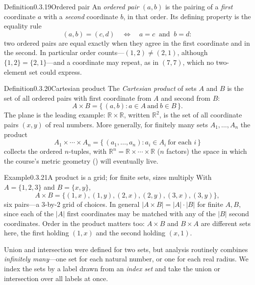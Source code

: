 \documentclass[main.tex]{subfiles}
\begin{document}
\begin{Obj}{Definition}{0.3.19}{Ordered pair}
An \emph{ordered pair} $(a,b)$ is the pairing of a \emph{first} coordinate $a$ with a \emph{second}
coordinate $b$, in that order. Its defining property is the equality rule
\[
(a,b)=(c,d)\quad\Longleftrightarrow\quad a=c \ \text{ and }\ b=d :
\]
two ordered pairs are equal exactly when they agree in the first coordinate and in the second. In
particular order counts---$(1,2)\neq(2,1)$, although $\{1,2\}=\{2,1\}$---and a coordinate may repeat,
as in $(7,7)$, which no two-element set could express.
\end{Obj}

\begin{Obj}{Definition}{0.3.20}{Cartesian product}
The \emph{Cartesian product} of sets $A$ and $B$ is the set of all ordered pairs with first coordinate
from $A$ and second from $B$:
\[
A\times B=\{\,(a,b) : a\in A \ \text{and}\ b\in B\,\}.
\]
The plane is the leading example: $\mathbb R\times\mathbb R$, written $\mathbb R^{2}$, is the set of
all coordinate pairs $(x,y)$ of real numbers. More generally, for finitely many sets
$A_{1},\dots,A_{n}$ the product
\[
A_{1}\times\cdots\times A_{n}=\{\,(a_{1},\dots,a_{n}) : a_{i}\in A_{i}\ \text{for each } i\,\}
\]
collects the ordered $n$-tuples, with $\mathbb R^{n}=\mathbb R\times\cdots\times\mathbb R$ ($n$
factors) the space in which the course's metric geometry () will eventually live.
\end{Obj}

\begin{ObjL}{Example}{0.3.21}{A product is a grid; for finite sets, sizes multiply}
With $A=\{1,2,3\}$ and $B=\{x,y\}$,
\[
A\times B=\bigl\{(1,x),(1,y),(2,x),(2,y),(3,x),(3,y)\bigr\},
\]
six pairs---a $3$-by-$2$ grid of choices. In general $\lvert A\times B\rvert=\lvert A\rvert\cdot\lvert
B\rvert$ for finite $A,B$, since each of the $\lvert A\rvert$ first coordinates may be matched with
any of the $\lvert B\rvert$ second coordinates. Order in the product matters too: $A\times B$ and
$B\times A$ are different sets here, the first holding $(1,x)$ and the second holding $(x,1)$.
\end{ObjL}

\noindent Union and intersection were defined for two sets, but analysis routinely combines
\emph{infinitely many}---one set for each natural number, or one for each real radius. We index the
sets by a label drawn from an \emph{index set} and take the union or intersection over all labels at
once.
\end{document}
